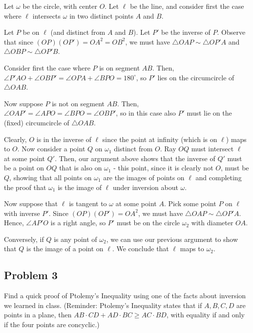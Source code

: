 \begin{mdsoln}    
Let $\omega$ be the circle, with center $O$. Let $\ell$ be the line, and consider first the case where $\ell$ intersects $\omega$ in two distinct points $A$ and $B$.

Let $P$ be on $\ell$ (and distinct from $A$ and $B$). Let $P'$ be the inverse of $P$. Observe that since $(OP)(OP')=OA^2=OB^2$, we must have $\triangle OAP\sim \triangle OP'A$ and $\triangle OBP\sim \triangle OP'B$.

Consider first the case where $P$ is on segment $AB$. Then, $\angle P'AO+\angle OBP'=\angle OPA+\angle BPO=180^\circ$, so $P'$ lies on the circumcircle of $\triangle OAB$.

Now suppose $P$ is not on segment $AB$. Then, $\angle OAP'=\angle APO=\angle BPO=\angle OBP'$, so in this case also $P'$ must lie on the (fixed) circumcircle of $\triangle OAB$.

Clearly, $O$ is in the inverse of $\ell$ since the point at infinity (which is on $\ell$) maps to $O$. Now consider a point $Q$ on $\omega_1$ distinct from $O$. Ray $OQ$ must intersect $\ell$ at some point $Q'$. Then, our argument above shows that the inverse of $Q'$ must be a point on $OQ$ that is also on $\omega_1$ - this point, since it is clearly not $O$, must be $Q$, showing that all points on $\omega_1$ are the images of points on $\ell$ and completing the proof that $\omega_1$ is the image of $\ell$ under inversion about $\omega$.

Now suppose that $\ell$ is tangent to $\omega$ at some point $A$. Pick some point $P$ on $\ell$ with inverse $P'$. Since $(OP)(OP')=OA^2$, we must have $\triangle OAP\sim \triangle OP'A$. Hence, $\angle AP'O$ is a right angle, so $P'$ must be on the circle $\omega_2$ with diameter $OA$.

Conversely, if $Q$ is any point of $\omega_2$, we can use our previous argument to show that $Q$ is the image of a point on $\ell$. We conclude that $\ell$ maps to $\omega_2$.
\end{mdsoln}

\subsection{Problem 3}
Find a quick proof of Ptolemy’s Inequality using one of the facts about inversion we learned in class. (Reminder: Ptolemy’s Inequality states that if $A, B, C, D$ are points in a plane, then $AB \cdot CD + AD\cdot BC \geq AC\cdot BD$, with equality if and only if the four points are concyclic.)

